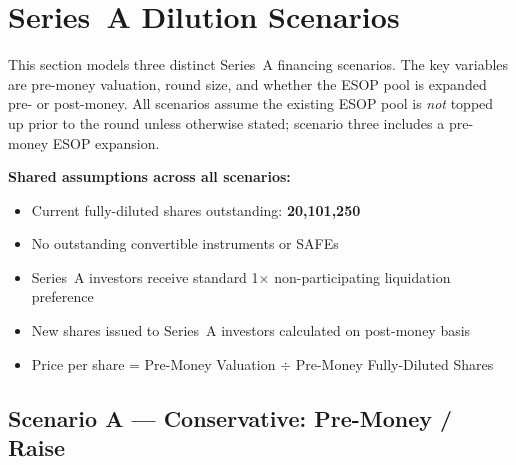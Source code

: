 
\section{Series~A Dilution Scenarios}

This section models three distinct Series~A financing scenarios. The key variables are
pre-money valuation, round size, and whether the ESOP pool is expanded pre- or post-money.
All scenarios assume the existing ESOP pool is \textit{not} topped up prior to the round
unless otherwise stated; scenario three includes a pre-money ESOP expansion.

\textbf{Shared assumptions across all scenarios:}
\begin{itemize}[leftmargin=1.4em, itemsep=2pt]
  \item Current fully-diluted shares outstanding: \textbf{20,101,250}
  \item No outstanding convertible instruments or SAFEs
  \item Series~A investors receive standard 1\(\times\) non-participating liquidation preference
  \item New shares issued to Series~A investors calculated on post-money basis
  \item Price per share = Pre-Money Valuation \(\div\) Pre-Money Fully-Diluted Shares
\end{itemize}

\vspace{10pt}

\subsection{Scenario A --- Conservative:  Pre-Money /  Raise}


\vspace{6pt}


